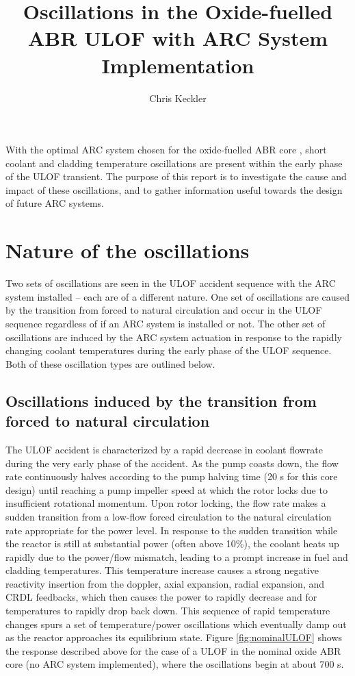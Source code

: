 \documentclass[11pt, oneside]{article}   	%
\title{Oscillations in the Oxide-fuelled ABR ULOF with ARC System Implementation}
\author{Chris Keckler}
\begin{document}
\maketitle

With the optimal ARC system chosen for the oxide-fuelled ABR core \cite{2017ANSWinter_ARC}, short coolant and cladding temperature oscillations are present within the early phase of the ULOF transient.
The purpose of this report is to investigate the cause and impact of these oscillations, and to gather information useful towards the design of future ARC systems.

\section{Nature of the oscillations}

Two sets of oscillations are seen in the ULOF accident sequence with the ARC system installed -- each are of a different nature.
One set of oscillations are caused by the transition from forced to natural circulation and occur in the ULOF sequence regardless of if an ARC system is installed or not.
The other set of oscillations are induced by the ARC system actuation in response to the rapidly changing coolant temperatures during the early phase of the ULOF sequence.
Both of these oscillation types are outlined below.

\subsection{Oscillations induced by the transition from forced to natural circulation} \label{flowInduced}

The ULOF accident is characterized by a rapid decrease in coolant flowrate during the very early phase of the accident.
As the pump coasts down, the flow rate continuously halves according to the pump halving time (20 s for this core design) until reaching a pump impeller speed at which the rotor locks due to insufficient rotational momentum.
Upon rotor locking, the flow rate makes a sudden transition from a low-flow forced circulation to the natural circulation rate appropriate for the power level.
In response to the sudden transition while the reactor is still at substantial power (often above 10\%), the coolant heats up rapidly due to the power/flow mismatch, leading to a prompt increase in fuel and cladding temperatures.
This temperature increase causes a strong negative reactivity insertion from the doppler, axial expansion, radial expansion, and CRDL feedbacks, which then causes the power to rapidly decrease and for temperatures to rapidly drop back down. 
This sequence of rapid temperature changes spurs a set of temperature/power oscillations which eventually damp out as the reactor approaches its equilibrium state.
Figure \ref{fig:nominalULOF} shows the response described above for the case of a ULOF in the nominal oxide ABR core (no ARC system implemented), where the oscillations begin at about 700 s.
\end{document}
